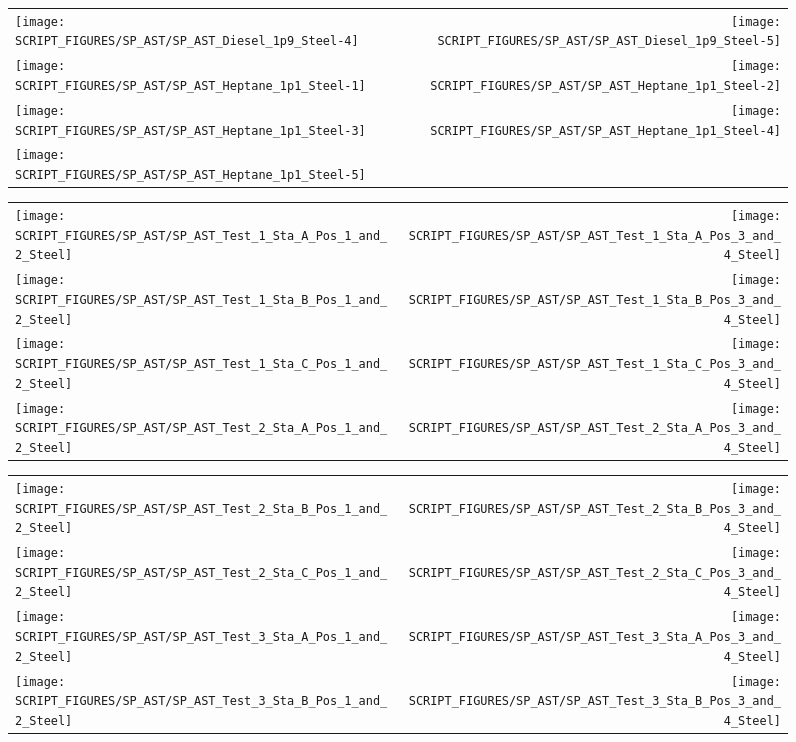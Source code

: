 \begin{figure}[!ht]
\begin{tabular*}{\textwidth}{l@{\extracolsep{\fill}}r}
\texttt{[image: SCRIPT\_FIGURES/SP\_AST/SP\_AST\_Diesel\_1p9\_Steel-4]} &
\texttt{[image: SCRIPT\_FIGURES/SP\_AST/SP\_AST\_Diesel\_1p9\_Steel-5]} \\
\texttt{[image: SCRIPT\_FIGURES/SP\_AST/SP\_AST\_Heptane\_1p1\_Steel-1]} &
\texttt{[image: SCRIPT\_FIGURES/SP\_AST/SP\_AST\_Heptane\_1p1\_Steel-2]} \\
\texttt{[image: SCRIPT\_FIGURES/SP\_AST/SP\_AST\_Heptane\_1p1\_Steel-3]} &
\texttt{[image: SCRIPT\_FIGURES/SP\_AST/SP\_AST\_Heptane\_1p1\_Steel-4]} \\
\texttt{[image: SCRIPT\_FIGURES/SP\_AST/SP\_AST\_Heptane\_1p1\_Steel-5]} 
\end{tabular*}
\end{figure}

\begin{figure}[!ht]
\begin{tabular*}{\textwidth}{l@{\extracolsep{\fill}}r}
\texttt{[image: SCRIPT\_FIGURES/SP\_AST/SP\_AST\_Test\_1\_Sta\_A\_Pos\_1\_and\_2\_Steel]} &
\texttt{[image: SCRIPT\_FIGURES/SP\_AST/SP\_AST\_Test\_1\_Sta\_A\_Pos\_3\_and\_4\_Steel]} \\
\texttt{[image: SCRIPT\_FIGURES/SP\_AST/SP\_AST\_Test\_1\_Sta\_B\_Pos\_1\_and\_2\_Steel]} &
\texttt{[image: SCRIPT\_FIGURES/SP\_AST/SP\_AST\_Test\_1\_Sta\_B\_Pos\_3\_and\_4\_Steel]} \\
\texttt{[image: SCRIPT\_FIGURES/SP\_AST/SP\_AST\_Test\_1\_Sta\_C\_Pos\_1\_and\_2\_Steel]} &
\texttt{[image: SCRIPT\_FIGURES/SP\_AST/SP\_AST\_Test\_1\_Sta\_C\_Pos\_3\_and\_4\_Steel]} \\
\texttt{[image: SCRIPT\_FIGURES/SP\_AST/SP\_AST\_Test\_2\_Sta\_A\_Pos\_1\_and\_2\_Steel]} &
\texttt{[image: SCRIPT\_FIGURES/SP\_AST/SP\_AST\_Test\_2\_Sta\_A\_Pos\_3\_and\_4\_Steel]}
\end{tabular*}
\end{figure}

\begin{figure}[!ht]
\begin{tabular*}{\textwidth}{l@{\extracolsep{\fill}}r}
\texttt{[image: SCRIPT\_FIGURES/SP\_AST/SP\_AST\_Test\_2\_Sta\_B\_Pos\_1\_and\_2\_Steel]} &
\texttt{[image: SCRIPT\_FIGURES/SP\_AST/SP\_AST\_Test\_2\_Sta\_B\_Pos\_3\_and\_4\_Steel]} \\
\texttt{[image: SCRIPT\_FIGURES/SP\_AST/SP\_AST\_Test\_2\_Sta\_C\_Pos\_1\_and\_2\_Steel]} &
\texttt{[image: SCRIPT\_FIGURES/SP\_AST/SP\_AST\_Test\_2\_Sta\_C\_Pos\_3\_and\_4\_Steel]} \\
\texttt{[image: SCRIPT\_FIGURES/SP\_AST/SP\_AST\_Test\_3\_Sta\_A\_Pos\_1\_and\_2\_Steel]} &
\texttt{[image: SCRIPT\_FIGURES/SP\_AST/SP\_AST\_Test\_3\_Sta\_A\_Pos\_3\_and\_4\_Steel]} \\
\texttt{[image: SCRIPT\_FIGURES/SP\_AST/SP\_AST\_Test\_3\_Sta\_B\_Pos\_1\_and\_2\_Steel]} &
\texttt{[image: SCRIPT\_FIGURES/SP\_AST/SP\_AST\_Test\_3\_Sta\_B\_Pos\_3\_and\_4\_Steel]}
\end{tabular*}
\end{figure}

